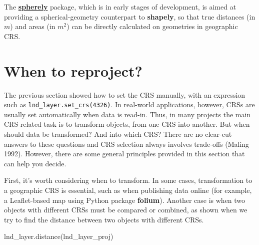 \documentclass[
  letterpaper,
]{krantz}
\newenvironment{Shaded}{\begin{snugshade}}{\end{snugshade}}
\newcommand{\NormalTok}[1]{\textcolor[rgb]{0.00,0.23,0.31}{#1}}
\begin{document}
\begin{tcolorbox}[enhanced jigsaw, colframe=quarto-callout-note-color-frame, arc=.35mm, leftrule=.75mm, bottomrule=.15mm, coltitle=black, colbacktitle=quarto-callout-note-color!10!white, title=\textcolor{quarto-callout-note-color}{\faInfo}\hspace{0.5em}{Note}, opacityback=0, toptitle=1mm, bottomtitle=1mm, colback=white, opacitybacktitle=0.6, titlerule=0mm, rightrule=.15mm, toprule=.15mm, breakable, left=2mm]

The \href{https://github.com/benbovy/spherely}{\textbf{spherely}}
package, which is in early stages of development, is aimed at providing
a spherical-geometry counterpart to \textbf{shapely}, so that true
distances (in \(m\)) and areas (in \(m^2\)) can be directly calculated
on geometries in geographic CRS.

\end{tcolorbox}

\section{When to reproject?}\label{sec-when-to-reproject}

The previous section showed how to set the CRS manually, with an
expression such as \texttt{lnd\_layer.set\_crs(4326)}. In real-world
applications, however, CRSs are usually set automatically when data is
read-in. Thus, in many projects the main CRS-related task is to
transform objects, from one CRS into another. But when should data be
transformed? And into which CRS? There are no clear-cut answers to these
questions and CRS selection always involves trade-offs (Maling 1992).
However, there are some general principles provided in this section that
can help you decide.

First, it's worth considering when to transform. In some cases,
transformation to a geographic CRS is essential, such as when publishing
data online (for example, a Leaflet-based map using Python package
\textbf{folium}). Another case is when two objects with different CRSs
must be compared or combined, as shown when we try to find the distance
between two objects with different CRSs.

\begin{Shaded}
\begin{Highlighting}[]
\NormalTok{lnd\_layer.distance(lnd\_layer\_proj)}
\end{Highlighting}
\end{Shaded}
\end{document}
